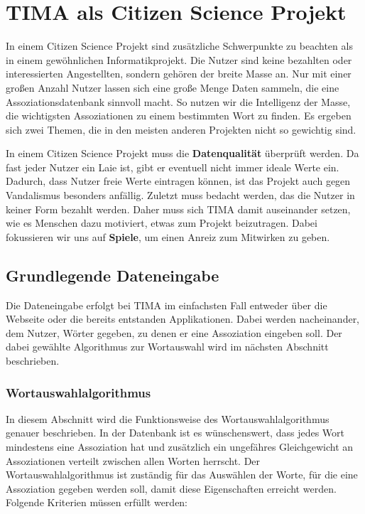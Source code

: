 \chapter{TIMA als Citizen Science Projekt}

In einem Citizen Science Projekt sind zusätzliche Schwerpunkte zu beachten als in einem gewöhnlichen Informatikprojekt. Die Nutzer sind keine bezahlten oder interessierten Angestellten, sondern gehören der breite Masse an. Nur mit einer großen Anzahl Nutzer lassen sich eine große Menge Daten sammeln, die eine Assoziationsdatenbank sinnvoll macht. So nutzen wir die Intelligenz der Masse, die wichtigsten Assoziationen zu einem bestimmten Wort zu finden. Es ergeben sich zwei Themen, die in den meisten anderen Projekten nicht so gewichtig sind.

In einem Citizen Science Projekt muss die \textbf{Datenqualität} überprüft werden. Da fast jeder Nutzer ein Laie ist, gibt er eventuell nicht immer ideale Werte ein. Dadurch, dass Nutzer freie Werte eintragen können, ist das Projekt auch gegen Vandalismus besonders anfällig. Zuletzt muss bedacht werden, das die Nutzer in keiner Form bezahlt werden. Daher muss sich TIMA damit auseinander setzen, wie es Menschen dazu motiviert, etwas zum Projekt beizutragen. Dabei fokussieren wir uns auf \textbf{Spiele}, um einen Anreiz zum Mitwirken zu geben.

\section{Grundlegende Dateneingabe}
Die Dateneingabe erfolgt bei TIMA im einfachsten Fall entweder über die Webseite oder die bereits entstanden Applikationen. Dabei werden nacheinander, dem Nutzer, Wörter gegeben, zu denen er eine Assoziation eingeben soll. Der dabei gewählte Algorithmus zur Wortauswahl wird im nächsten Abschnitt beschrieben.

\subsection{Wortauswahlalgorithmus}\label{subsec:Wortauswahlalgorithmus}
In diesem Abschnitt wird die Funktionsweise des Wortauswahlalgorithmus genauer beschrieben. In der Datenbank ist es wünschenswert, dass jedes Wort mindestens eine Assoziation hat und zusätzlich ein ungefähres Gleichgewicht an Assoziationen verteilt zwischen allen Worten herrscht. Der Wortauswahlalgorithmus ist zuständig für das Auswählen der Worte, für die eine Assoziation gegeben werden soll, damit diese Eigenschaften erreicht werden. Folgende Kriterien müssen erfüllt werden:

